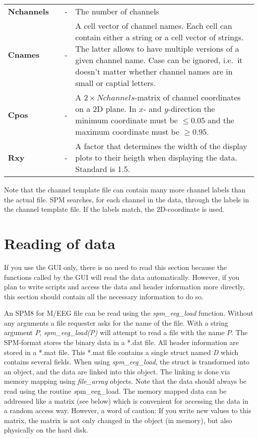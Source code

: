 \begin{tabular}{llcp{9cm}}
{\bf Nchannels} & &  - & The number of channels\\
{\bf Cnames}&  & - & A cell vector of channel names. Each cell can
contain either a string or a cell vector of strings. The latter allows
to have multiple versions of a given channel name. Case can be
ignored, i.e.~it doesn't matter whether channel names are in small or
captial letters.\\
{\bf Cpos} & & - & A $2 \times Nchannels$-matrix of channel
coordinates on a 2D plane. In $x$- and $y$-direction the minimum
coordinate must be $\leq 0.05$ and the maximum coordinate
must be $\geq 0.95$. \\ 
{\bf Rxy} & & - & A factor that determines the width of the display
plots to their heigth when displaying the data. Standard is 1.5. \\
\end{tabular}

Note that the channel template file can contain many more channel
labels than the actual file. SPM searches, for each channel in the
data, through the labels in the channel template file. If the labels
match, the 2D-coordinate is used. 


\section{Reading of data}
\label{sec:load}
If you use the GUI only, there is no need to read this
section because the functions called by the GUI will read the data
automatically. However, if you plan to write scripts and access the
data and header information more directly, this section should contain
all the necessary information to do so. 

An SPM8 for M/EEG file can be read using the \textit{spm\_eeg\_load}
function. Without any arguments a file requester asks for the name of
the file. With a string argument $P$, \textit{spm\_eeg\_load(P)} will
attempt to read a file with the name $P$. The SPM-format stores the
binary data in a *.dat file. All header information are stored in a
*.mat file. This *.mat file contains a single struct named {\textit D}
which contains several fields. When using \textit{spm\_eeg\_load}, the
struct is transformed into an object, and the data are linked into this
object. The linking is done via memory mapping using \textit{file\_array}
objects. Note that the data should always be read using the routine 
{\textit spm\_eeg\_load}. The memory mapped data can be
addressed like a matrix (see below) which is convenient for accessing
the data in a random access way. However, a word of caution: If you
write new values to this matrix, the matrix is not only changed
in the object (in memory), but also physically on the hard
disk.  

